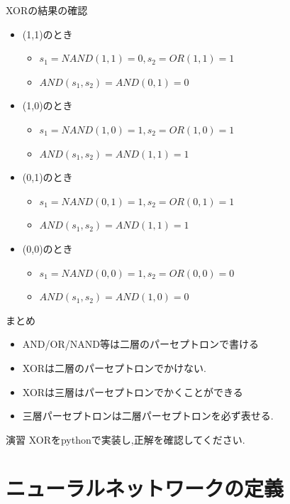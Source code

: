 \begin{frame}[fragile]{XORの結果の確認}
\begin{itemize}
\item (1,1)のとき
  \begin{itemize}
  \item $s_1 = NAND(1,1) = 0, s_2 = OR(1, 1) = 1$
  \item $AND(s_1, s_2) = AND(0, 1) = 0$
  \end{itemize}
\item (1,0)のとき
  \begin{itemize}
  \item $s_1 = NAND(1,0) = 1, s_2 = OR(1, 0) = 1$
  \item $AND(s_1, s_2) = AND(1, 1) = 1$
  \end{itemize}
\item (0,1)のとき
  \begin{itemize}
  \item $s_1 = NAND(0,1) = 1, s_2 = OR(0, 1) = 1$
  \item $AND(s_1, s_2) = AND(1, 1) = 1$
  \end{itemize}
\item (0,0)のとき
  \begin{itemize}
  \item $s_1 = NAND(0,0) = 1, s_2 = OR(0, 0) = 0$
  \item $AND(s_1, s_2) = AND(1, 0) = 0$
  \end{itemize}
\end{itemize}
\end{frame}


\begin{frame}[fragile]{まとめ}
\begin{itemize}
\item AND/OR/NAND等は二層のパーセプトロンで書ける
\item XORは二層のパーセプトロンでかけない.
\item XORは三層はパーセプトロンでかくことができる
\item 三層パーセプトロンは二層パーセプトロンを必ず表せる.
\end{itemize}
\end{frame}


\begin{frame}[fragile]{演習}
XORをpythonで実装し,正解を確認してください.
\end{frame}


\section{ニューラルネットワークの定義}


